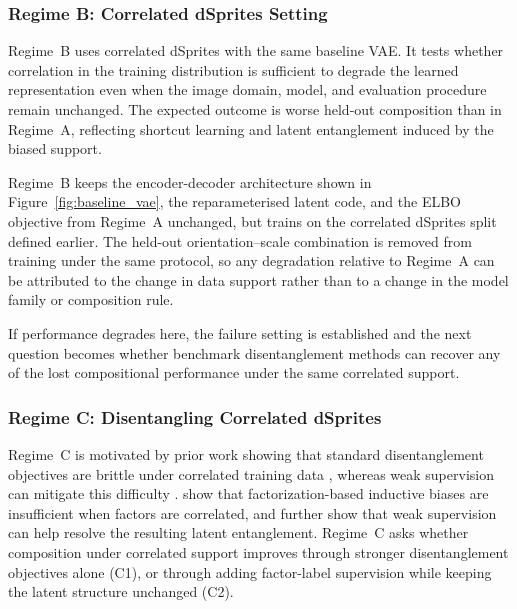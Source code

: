 \subsubsection{Regime B:  Correlated dSprites Setting}

Regime~B uses correlated dSprites with the same baseline VAE. It tests whether correlation in the
training distribution is sufficient to degrade the learned representation even when the image
domain, model, and evaluation procedure remain unchanged. The expected outcome is worse
held-out composition than in Regime~A, reflecting shortcut learning and latent entanglement
induced by the biased support.

Regime~B keeps the encoder-decoder architecture shown in
Figure~\ref{fig:baseline_vae}, the reparameterised latent code, and the ELBO objective from
Regime~A unchanged, but trains on the correlated dSprites split defined earlier. The held-out
orientation--scale combination is removed from training under the same protocol, so any
degradation relative to Regime~A can be attributed to the change in data support rather than to a
change in the model family or composition rule.

If performance degrades here, the failure setting is established and the next question becomes
whether benchmark disentanglement methods can recover any of the lost compositional performance
under the same correlated support.

\subsubsection{Regime C: Disentangling Correlated dSprites}
Regime~C is motivated by prior work showing that standard disentanglement objectives are brittle under correlated training data \citep{challeau2019challenging}, whereas weak supervision can mitigate this difficulty \citep{weakly_supervised_disentanglement}. 
\citet{traeuble2021disentangled} show that factorization-based inductive biases are insufficient when factors are correlated, and further show that weak supervision can help resolve the resulting latent entanglement. 
Regime~C asks whether composition under correlated support improves through stronger disentanglement objectives alone (C1), or through adding factor-label supervision while keeping the latent structure unchanged (C2).


